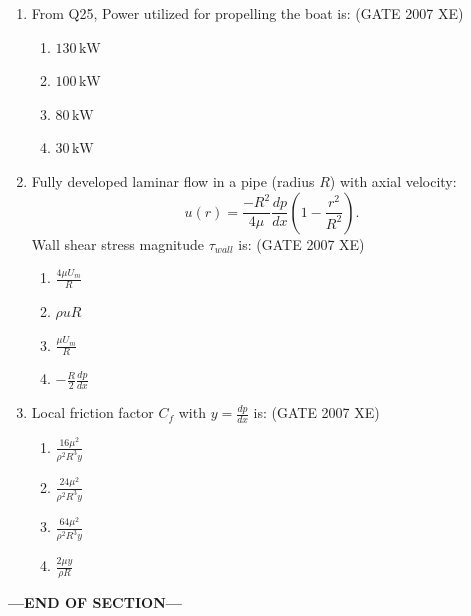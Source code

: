 \documentclass[journal,cmex10]{IEEEtran}
\theoremstyle{remark}
\numberwithin{equation}{enumi}
\numberwithin{figure}{enumi}
\begin{document}
\begin{enumerate}
\item From Q25, Power utilized for propelling the boat is:  
\hfill{(GATE 2007 XE)}
\begin{multicols}{4}
\begin{enumerate}
    \item $130\,\text{kW}$
    \item $100\,\text{kW}$
    \item $80\,\text{kW}$
    \item $30\,\text{kW}$
\end{enumerate}
\end{multicols}

\item Fully developed laminar flow in a pipe (radius $R$) with axial velocity:  
\[
u(r) = \frac{-R^2}{4\mu} \frac{dp}{dx} \left(1 - \frac{r^2}{R^2}\right).
\]  
Wall shear stress magnitude $\tau_{wall}$ is:  
\hfill{(GATE 2007 XE)}
\begin{multicols}{4}
\begin{enumerate}
    \item $\frac{4 \mu U_m}{R}$
    \item $\rho u R$
    \item $\frac{\mu U_m}{R}$
    \item $-\frac{R}{2} \frac{dp}{dx}$
\end{enumerate}
\end{multicols}

\item Local friction factor $C_f$ with $y = \frac{dp}{dx}$ is:  
\hfill{(GATE 2007 XE)}
\begin{multicols}{4}
\begin{enumerate}
    \item $\frac{16 \mu^2}{\rho^2 R^3 y}$
    \item $\frac{24 \mu^2}{\rho^2 R^3 y}$
    \item $\frac{64 \mu^2}{\rho^2 R^3 y}$
    \item $\frac{2 \mu y}{\rho R}$
\end{enumerate}
\end{multicols}


\end{enumerate}

    \begin{center}
    \textbf{\Large ---END OF SECTION---}
    \end{center}
\end{document}
